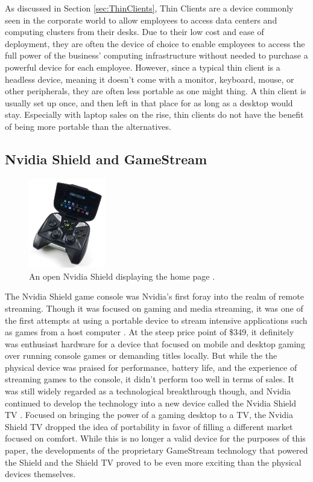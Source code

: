 As discussed in Section \ref{sec:ThinClients}, Thin Clients are a device commonly seen in the corporate world to allow employees to access data centers and computing clusters from their desks.
Due to their low cost and ease of deployment, they are often the device of choice to enable employees to access the full power of the business' computing infrastructure without needed to purchase a powerful device for each employee.
However, since a typical thin client is a headless device, meaning it doesn't come with a monitor, keyboard, mouse, or other peripherals, they are often less portable as one might thing.
A thin client is usually set up once, and then left in that place for as long as a desktop would stay.
Especially with laptop sales on the rise, thin clients do not have the benefit of being more portable than the alternatives.

\subsection{Nvidia Shield and GameStream}\label{subsec:NvidiaShieldAndGameStream}

\begin{figure}
  \centering
  \includegraphics[width=0.3\textwidth]{Figures/nvidia-shield-open-ifixit}
  \caption[Nvidia Shield]{An open Nvidia Shield displaying the home page \cite{ImageNvidiaShield}.}
  \label{fig:nvidiashield}
\end{figure}

The Nvidia Shield game console was Nvidia's first foray into the realm of remote streaming.
Though it was focused on gaming and media streaming, it was one of the first attempts at using a portable device to stream intensive applications such as games from a host computer \cite{brown_2013}.
At the steep price point of \$349, it definitely was enthusiast hardware for a device that focused on mobile and desktop gaming over running console games or demanding titles locally.
But while the the physical device was praised for performance, battery life, and the experience of streaming games to the console, it didn't perform too well in terms of sales.
It was still widely regarded as a technological breakthrough though, and Nvidia continued to develop the technology into a new device called the Nvidia Shield TV \cite{daniel_2017}.
Focused on bringing the power of a gaming desktop to a TV, the Nvidia Shield TV dropped the idea of portability in favor of filling a different market focused on comfort.
While this is no longer a valid device for the purposes of this paper, the developments of the proprietary GameStream technology that powered the Shield and the Shield TV proved to be even more exciting than the physical devices themselves.

